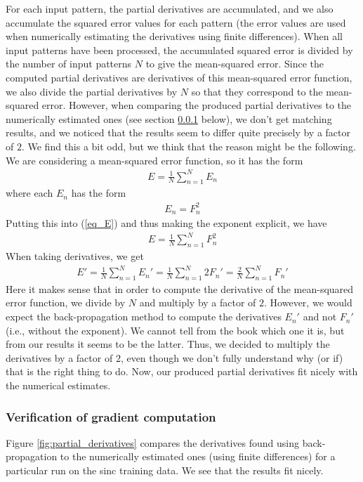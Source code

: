 \documentclass[a4paper]{article}
\begin{document}
For each input pattern, the partial derivatives are accumulated, and we also accumulate the squared error values for each pattern (the error values are used when numerically estimating the derivatives using finite differences). When all input patterns have been processed, the accumulated squared error is divided by the number of input patterns $N$ to give the mean-squared error. Since the computed partial derivatives are derivatives of this mean-squared error function, we also divide the partial derivatives by $N$ so that they correspond to the mean-squared error. However, when comparing the produced partial derivatives to the numerically estimated ones (see section \ref{gradient_verification} below), we don't get matching results, and we noticed that the results seem to differ quite precisely by a factor of $2$. We find this a bit odd, but we think that the reason might be the following. We are considering a mean-squared error function, so it has the form
\begin{align}
  E = \frac{1}{N} \sum_{n=1}^{N} E_n \label{eq_E}
\end{align}
where each $E_n$ has the form
\begin{align*}
  E_n = F_n^2
\end{align*}
Putting this into (\ref{eq_E}) and thus making the exponent explicit, we have
\begin{align*}
  E = \frac{1}{N} \sum_{n=1}^{N} F_n^2
\end{align*}
When taking derivatives, we get
\begin{align*}
  E' = \frac{1}{N} \sum_{n=1}^{N} E_n' = \frac{1}{N} \sum_{n=1}^{N} 2 F_n' = \frac{2}{N} \sum_{n=1}^{N} F_n'
\end{align*}
Here it makes sense that in order to compute the derivative of the mean-squared error function, we divide by $N$ and multiply by a factor of $2$. However, we would expect the back-propagation method to compute the derivatives $E_n'$ and not $F_n'$ (i.e., without the exponent). We cannot tell from the book which one it is, but from our results it seems to be the latter. Thus, we decided to multiply the derivatives by a factor of $2$, even though we don't fully understand why (or if) that is the right thing to do. Now, our produced partial derivatives fit nicely with the numerical estimates.

\subsubsection{Verification of gradient computation} \label{gradient_verification}
Figure \ref{fig:partial_derivatives} compares the derivatives found using back-propagation to the numerically estimated ones (using finite differences) for a particular run on the sinc training data. We see that the results fit nicely.
\end{document}
